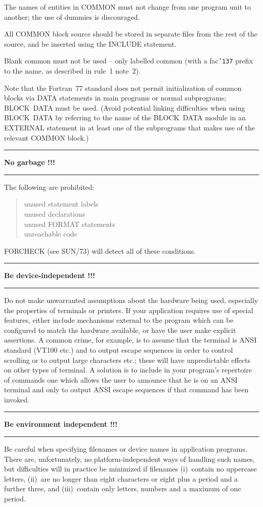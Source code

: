 \documentclass[twoside,11pt,nolof,noabs]{starlink}
\newcounter{sruleno}
\providecommand{\srule}[1]{
    \addtocounter{sruleno}{1}
    \goodbreak
    \rule{\textwidth}{0.3mm}
    \textbf{#1} \scpushright{ \textbf{\thesruleno}}
    \rule{\textwidth}{0.1mm}
}
\renewcommand{\_}{{\tt\char'137}}
\begin{document}
The names of entities in COMMON must not change from one program unit to
another; the use of dummies is discouraged.

All COMMON block source should be stored in separate files from the rest of the
source, and be inserted using the INCLUDE statement.

Blank common must not be used -- only labelled common (with a fac\_ prefix to
the name, as described in rule~1 note~2).

Note that the Fortran~77 standard does not permit initialization of common
blocks via DATA statements in main programs or normal subprograms;
BLOCK~DATA must be used.  (Avoid potential linking difficulties
when using BLOCK~DATA by referring to the name of the BLOCK~DATA module in an
EXTERNAL statement in at least one of the subprograms that makes use of
the relevant COMMON block.)

\srule{No garbage !!!}
The following are prohibited:
\begin{quote}
\begin{tabbing}
unused statement labels\\
unused declarations\\
unused FORMAT statements\\
unreachable code\\
\end{tabbing}
\end{quote}
FORCHECK (see SUN/73) will detect all of these conditions.

\srule{Be device-independent !!!}
Do not make unwarranted assumptions about the
hardware being used, especially the properties of
terminals or printers.  If your application requires
use of special features, either include mechanisms
external to the program which can be configured to
match the hardware available, or have the user make
explicit assertions.  A common crime, for example, is
to assume that the terminal is ANSI standard (VT100 etc.)
and to output escape sequences in order to control
scrolling or to output large characters etc.; these
will have unpredictable effects on other types of
terminal.  A solution is to include
in your program's repertoire of commands one which allows
the user to announce that he is on an ANSI terminal and
only to output ANSI escape sequences if that
command has been invoked.

\srule{Be environment independent !!!}
Be careful when specifying filenames or device names in application
programs.  There are, unfortunately, no platform-independent ways
of handling such names, but difficulties will in practice
be minimized if
filenames (i)~contain no uppercase letters, (ii)~are no longer than
eight characters or eight plus a period and a further three,
and (iii)~contain only letters, numbers and a maximum of
one period.
\end{document}
